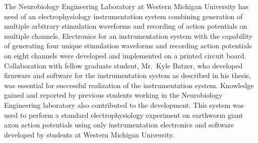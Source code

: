 \vspace{0.5\baselineskip}

The Neurobiology Engineering Laboratory at Western Michigan University has need of an electrophysiology instrumentation system combining generation of multiple arbitrary stimulation waveforms and recording of action potentials on multiple channels.  Electronics for an instrumentation system with the capability of generating four unique stimulation waveforms and recording action potentials on eight channels were developed and implemented on a printed circuit board.  Collaboration with fellow graduate student, Mr.~Kyle Batzer, who developed firmware and software for the instrumentation system as described in his thesis, was essential for successful realization of the instrumentation system.  Knowledge gained and reported by previous students working in the Neurobiology Engineering laboratory also contributed to the development.  This system was used to perform a standard electrophysiology
experiment on earthworm giant axon action potentials using only instrumentation electronics and software developed by students at Western Michigan University.




% 
